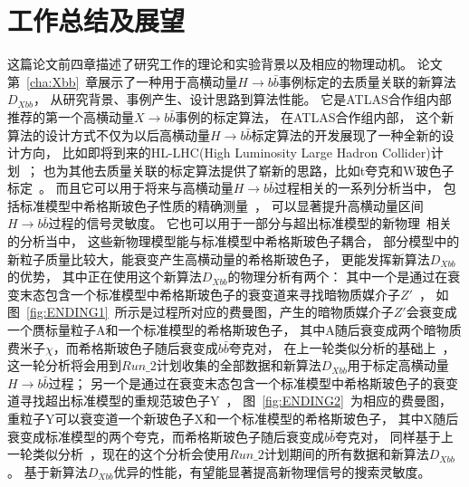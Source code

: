 
\chapter{工作总结及展望}
\label{cha:Summary}

这篇论文前四章描述了研究工作的理论和实验背景以及相应的物理动机。
论文第~\ref{cha:Xbb}~章展示了一种用于高横动量$H\rightarrow b\bar{b}$事例标定的去质量关联的新算法$D_{Xbb}$，
从研究背景、事例产生、设计思路到算法性能。
它是ATLAS合作组内部推荐的第一个高横动量$X\rightarrow b\bar{b}$事例的标定算法，
在ATLAS合作组内部，
这个新算法的设计方式不仅为以后高横动量$H\rightarrow b\bar{b}$标定算法的开发展现了一种全新的设计方向，
比如即将到来的HL-LHC(High Luminosity Large Hadron Collider)计划~\cite{HLLHC}；
也为其他去质量关联的标定算法提供了崭新的思路，比如t夸克和W玻色子标定~\cite{ATL-PHYS-PUB-2017-004}。
而且它可以用于将来与高横动量$H\rightarrow b\bar{b}$过程相关的一系列分析当中，
包括标准模型中希格斯玻色子性质的精确测量~\cite{AHbb6,AHbb7,AHbb8,AHbb5}，
可以显著提升高横动量区间$H\rightarrow b\bar{b}$过程的信号灵敏度。
它也可以用于一部分与超出标准模型的新物理~\cite{BSMHIGGS1,BSMHIGGS2,BSMHIGGS3,DXBB6,DXBB7}相关的分析当中，
这些新物理模型能与标准模型中希格斯玻色子耦合，
部分模型中的新粒子质量比较大，能衰变产生高横动量的希格斯玻色子，
更能发挥新算法$D_{Xbb}$的优势，
其中正在使用这个新算法$D_{Xbb}$的物理分析有两个：
其中一个是通过在衰变末态包含一个标准模型中希格斯玻色子的衰变道来寻找暗物质媒介子$Z'$~\cite{DXBB4,DXBB5,DXBB6}，
如图~\ref{fig:ENDING1}~所示是过程所对应的费曼图，产生的暗物质媒介子$Z'$会衰变成一个赝标量粒子A和一个标准模型的希格斯玻色子，
其中A随后衰变成两个暗物质费米子$\chi$，而希格斯玻色子随后衰变成$b\bar{b}$夸克对，
在上一轮类似分析的基础上~\cite{DXBB3}，
这一轮分析将会用到$Run\_2$计划收集的全部数据和新算法$D_{Xbb}$用于标定高横动量$H\rightarrow b\bar{b}$过程；
另一个是通过在衰变末态包含一个标准模型中希格斯玻色子的衰变道寻找超出标准模型的重规范玻色子Y~\cite{DXBB7,DXBB8,DXBB9,DXBB10,DXBB11}，
图~\ref{fig:ENDING2}~为相应的费曼图，重粒子Y可以衰变道一个新玻色子X和一个标准模型的希格斯玻色子，
其中X随后衰变成标准模型的两个夸克，而希格斯玻色子随后衰变成$b\bar{b}$夸克对，
同样基于上一轮类似分析~\cite{DXBB2}，现在的这个分析会使用$Run\_2$计划期间的所有数据和新算法$D_{Xbb}$。
基于新算法$D_{Xbb}$优异的性能，有望能显著提高新物理信号的搜索灵敏度。


